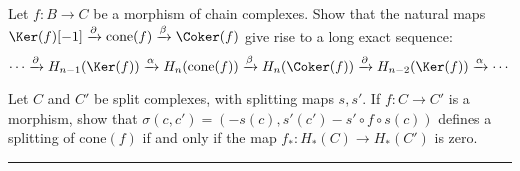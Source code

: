 \begin{exer} Let $f:B\rightarrow C$ be a morphism of chain complexes. Show that the natural maps $\Ker(f)[-1]\xrightarrow{\partial} \textrm{cone}(f)\xrightarrow{\beta} \Coker(f)$ give rise to a long exact sequence:
\begin{equation}
\cdots\xrightarrow{\partial} H_{n-1}(\Ker(f))\xrightarrow{\alpha} H_n(\textrm{cone}(f))\xrightarrow{\beta} H_n(\Coker(f))\xrightarrow{\partial} H_{n-2}(\Ker(f))\xrightarrow{\alpha}\cdots
\end{equation}
\end{exer}
\begin{solution}
\end{solution}

\begin{exer} Let $C$ and $C'$ be split complexes, with splitting maps $s,s'$. If $f:C\rightarrow C'$ is a morphism, show that $\sigma(c,c')=(-s(c),s'(c')-s'\circ f\circ s(c))$ defines a splitting of $\textrm{cone}(f)$ if and only if the map $f_*:H_*(C)\rightarrow H_*(C')$ is zero.
\end{exer}
\begin{solution}
\end{solution}
\noindent\rule{\textwidth}{1pt}
\newline